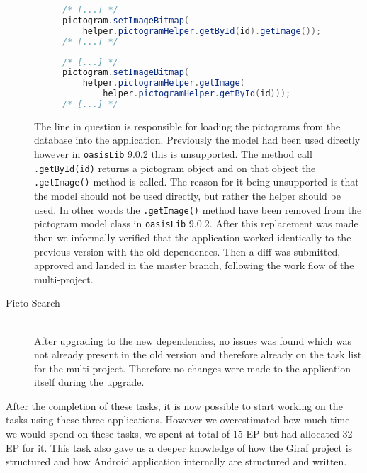 \begin{description}
    \begin{figure} 
        \begin{lstlisting}[language=java, caption={Sequence with deprecated method call. }, label=lst:dep-seq-prev] 
/* [...] */ 
pictogram.setImageBitmap( 
    helper.pictogramHelper.getById(id).getImage()); 
/* [...] */ 
        \end{lstlisting} 
    \end{figure} 
    \begin{figure} 
        \begin{lstlisting}[language=java, caption={Sequence using the replacement code. }, label=lst:dep-seq-upd] 
/* [...] */ 
pictogram.setImageBitmap( 
    helper.pictogramHelper.getImage( 
        helper.pictogramHelper.getById(id))); 
/* [...] */ 
        \end{lstlisting} 
    \end{figure} 
    The line in question is responsible for loading the pictograms from the database into the application. 
     Previously the model had been used directly however in \texttt{oasisLib} 9.0.2 this is unsupported. 
    The method call \texttt{.getById(id)} returns a pictogram object and on that object the \texttt{.getImage()} method is called. 
    The reason for it being unsupported is that the model should not be used directly, but rather the helper should be used. 
    In other words the \texttt{.getImage()} method have been removed from the pictogram model class in \texttt{oasisLib} 9.0.2. 
     After this replacement was made then we informally verified that the application worked identically to the previous version with the old dependences. 
    Then a diff was submitted, approved and landed in the master branch, following the work flow of the multi-project. 
    \item[Picto Search] \hfill \\
    After upgrading to the new dependencies, no issues was found which was not already present in the old version and therefore already on the task list for the multi-project. 
    Therefore no changes were made to the application itself during the upgrade. 
 \end{description}
 
 After the completion of these tasks, it is now possible to start working on the tasks using these three applications. 
 However we overestimated how much time we would spend on these tasks, we spent at total of 15 EP but had allocated 32 EP for it. 
 This task also gave us a deeper knowledge of how the Giraf project is structured and how Android application internally are structured and written. 
